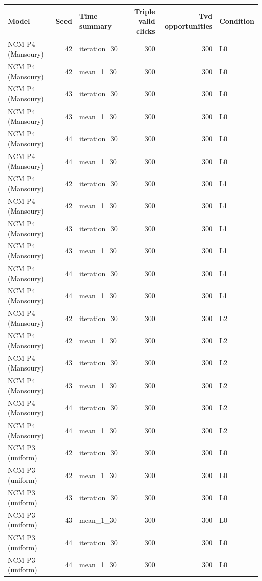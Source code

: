 \begin{table}[htbp!]
\centering
\small
\setlength{\tabcolsep}{3pt}
\renewcommand{\arraystretch}{1.1}
\begin{tabular}{lrlrrl}
\hline
Model & Seed & Time summary & Triple valid clicks & Tvd opportunities & Condition \\
\hline
NCM P4 (Mansoury) & 42 & iteration\_30 & 300 & 300 & L0 \\
NCM P4 (Mansoury) & 42 & mean\_1\_30 & 300 & 300 & L0 \\
NCM P4 (Mansoury) & 43 & iteration\_30 & 300 & 300 & L0 \\
NCM P4 (Mansoury) & 43 & mean\_1\_30 & 300 & 300 & L0 \\
NCM P4 (Mansoury) & 44 & iteration\_30 & 300 & 300 & L0 \\
NCM P4 (Mansoury) & 44 & mean\_1\_30 & 300 & 300 & L0 \\
NCM P4 (Mansoury) & 42 & iteration\_30 & 300 & 300 & L1 \\
NCM P4 (Mansoury) & 42 & mean\_1\_30 & 300 & 300 & L1 \\
NCM P4 (Mansoury) & 43 & iteration\_30 & 300 & 300 & L1 \\
NCM P4 (Mansoury) & 43 & mean\_1\_30 & 300 & 300 & L1 \\
NCM P4 (Mansoury) & 44 & iteration\_30 & 300 & 300 & L1 \\
NCM P4 (Mansoury) & 44 & mean\_1\_30 & 300 & 300 & L1 \\
NCM P4 (Mansoury) & 42 & iteration\_30 & 300 & 300 & L2 \\
NCM P4 (Mansoury) & 42 & mean\_1\_30 & 300 & 300 & L2 \\
NCM P4 (Mansoury) & 43 & iteration\_30 & 300 & 300 & L2 \\
NCM P4 (Mansoury) & 43 & mean\_1\_30 & 300 & 300 & L2 \\
NCM P4 (Mansoury) & 44 & iteration\_30 & 300 & 300 & L2 \\
NCM P4 (Mansoury) & 44 & mean\_1\_30 & 300 & 300 & L2 \\
NCM P3 (uniform) & 42 & iteration\_30 & 300 & 300 & L0 \\
NCM P3 (uniform) & 42 & mean\_1\_30 & 300 & 300 & L0 \\
NCM P3 (uniform) & 43 & iteration\_30 & 300 & 300 & L0 \\
NCM P3 (uniform) & 43 & mean\_1\_30 & 300 & 300 & L0 \\
NCM P3 (uniform) & 44 & iteration\_30 & 300 & 300 & L0 \\
NCM P3 (uniform) & 44 & mean\_1\_30 & 300 & 300 & L0 \\

\end{tabular}
\end{table}
